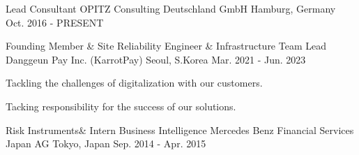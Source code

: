 

\begin{cventries}

  \cventry
    {Lead Consultant} %
    {OPITZ Consulting Deutschland GmbH} %
    {Hamburg, Germany} %
    {Oct. 2016 - PRESENT} %
    {
    }

  \cventry
    {Founding Member \& Site Reliability Engineer \& Infrastructure Team Lead} %
    {Danggeun Pay Inc. (KarrotPay)} %
    {Seoul, S.Korea} %
    {Mar. 2021 - Jun. 2023} %
    {
      \begin{cvitems} %
        \item{Tackling the challenges of digitalization with our customers.}
        \item{Tacking responsibility for the success of our solutions.}
      \end{cvitems}
    }
  \cventry
    {Risk Instruments\& Intern Business Intelligence} %
    {Mercedes Benz Financial Services Japan AG} %
    {Tokyo, Japan} %
    {Sep. 2014 - Apr. 2015} %
    {
    }


\end{cventries}
